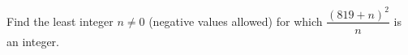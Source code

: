 Find the least integer $n\ne0$ (negative values allowed) for which $\dfrac{(819+n)^2}{n}$ is an integer.
